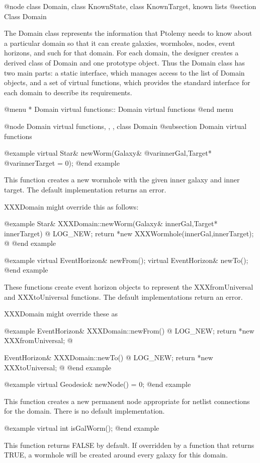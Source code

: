 @node class Domain, class KnownState, class KnownTarget, known lists
@section Class Domain

The Domain class represents the information that Ptolemy needs to know
about a particular domain so that it can create galaxies, wormholes,
nodes, event horizons, and such for that domain.  For each domain,
the designer creates a derived class of Domain and one prototype object.
Thus the Domain class has two main parts: a static interface, which
manages access to the list of Domain objects, and a set of virtual
functions, which provides the standard interface for each domain to
describe its requirements.

@menu
* Domain virtual functions::  Domain virtual functions
@end menu

@node Domain virtual functions,  ,  , class Domain
@subsection Domain virtual functions

@example
virtual Star& newWorm(Galaxy& @var{innerGal},Target* @var{innerTarget} = 0);
@end example

This function creates a new wormhole with the given inner galaxy and
inner target.  The default implementation returns an error.

XXXDomain might override this as follows:

@example
Star& XXXDomain::newWorm(Galaxy& innerGal,Target* innerTarget)  @{
        LOG_NEW; return *new XXXWormhole(innerGal,innerTarget);
@}
@end example

@example
virtual EventHorizon& newFrom();
virtual EventHorizon& newTo();
@end example

These functions create event horizon objects to represent the
XXXfromUniversal and XXXtoUniversal functions.  The default
implementations return an error.

XXXDomain might override these as

@example
EventHorizon& XXXDomain::newFrom() @{
    LOG_NEW; return *new XXXfromUniversal;
@}

EventHorizon& XXXDomain::newTo() @{
    LOG_NEW; return *new XXXtoUniversal;
@}
@end example

@example
virtual Geodesic& newNode() = 0;
@end example

This function creates a new permanent node appropriate for netlist
connections for the domain.  There is no default implementation.

@example
virtual int isGalWorm();
@end example

This function returns FALSE by default.  If overridden by a function
that returns TRUE, a wormhole will be created around every galaxy
for this domain.

